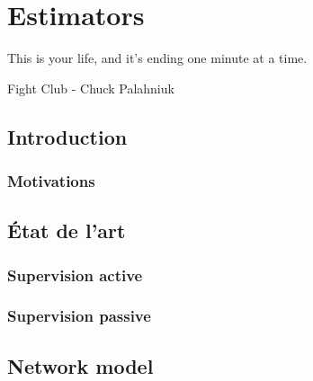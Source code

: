 \chapter{Estimators} %
\label{cha:estimators}

\epigraph{This is your life, and it's ending one minute at a time.}{Fight Club - Chuck Palahniuk}

\minitoc

\section{Introduction} %
\label{sec:estimators_introduction}

\lipsum

\subsection{Motivations} %
\label{sub:motivations}

\lipsum



\section{État de l'art} %
\label{sec:_tat_de_l_art}

\lipsum

\subsection{Supervision active} %
\label{sub:supervision_active}

\lipsum


\subsection{Supervision passive} %
\label{sub:supervision_passive}



\section{Network model} %
\label{sec:estimators_network_model}

